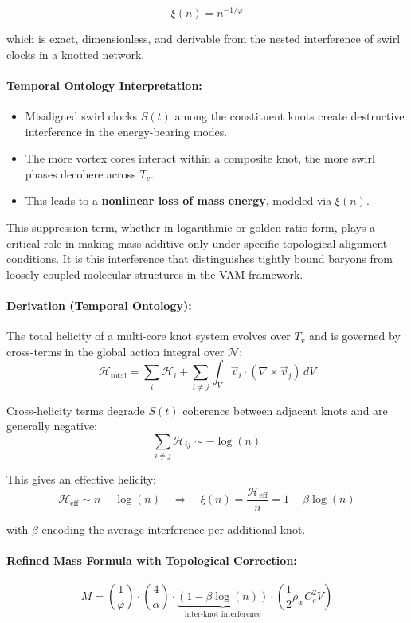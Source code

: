 \documentclass[12pt]{article}
\begin{document}
\[
\boxed{
\xi(n) = n^{-1/\varphi}
}
\]

which is exact, dimensionless, and derivable from the nested interference of swirl clocks in a knotted network.

\paragraph{Temporal Ontology Interpretation:}
\begin{itemize}
\item  Misaligned swirl clocks \( S(t) \) among the constituent knots create destructive interference in the energy-bearing modes.
\item  The more vortex cores interact within a composite knot, the more swirl phases decohere across \( T_v \).
\item  This leads to a \textbf{nonlinear loss of mass energy}, modeled via \( \xi(n) \).
\end{itemize}

This suppression term, whether in logarithmic or golden-ratio form, plays a critical role in making mass additive only under specific topological alignment conditions. It is this interference that distinguishes tightly bound baryons from loosely coupled molecular structures in the VAM framework.

\paragraph{Derivation (Temporal Ontology):}
The total helicity of a multi-core knot system evolves over $T_v$ and is governed by cross-terms in the global action integral over $\mathcal{N}$:
\begin{equation}
\mathcal{H}_{\text{total}} = \sum_i \mathcal{H}_i + \sum_{i \neq j} \int_V \vec{v}_i \cdot (\nabla \times \vec{v}_j) \, dV
\end{equation}

Cross-helicity terms degrade $S(t)$ coherence between adjacent knots and are generally negative:
\[
\sum_{i \neq j} \mathcal{H}_{ij} \sim -\log(n)
\]

This gives an effective helicity:
\[
\mathcal{H}_{\text{eff}} \sim n - \log(n)
\quad \Rightarrow \quad
\xi(n) = \frac{\mathcal{H}_{\text{eff}}}{n} = 1 - \beta \log(n)
\]

with $\beta$ encoding the average interference per additional knot.

\paragraph{Refined Mass Formula with Topological Correction:}
\begin{equation}
\boxed{
M = \left( \frac{1}{\varphi} \right) \cdot \left( \frac{4}{\alpha} \right) \cdot \underbrace{\left(1 - \beta \log(n)\right)}_{\text{inter-knot interference}} \cdot \left( \frac{1}{2} \rho_\text{\ae} C_e^2 V \right)
}
\end{equation}
\end{document}
